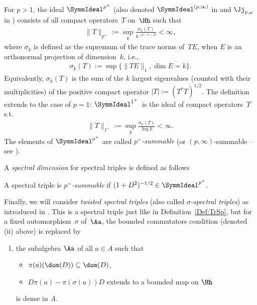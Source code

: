 \begin{Definition}
\label{Def:DixmierSum}
For $p>1$, the ideal $\SymmIdeal^{p^+}$ (also denoted $\SymmIdeal^{(p,\infty )}$ in \cite{NCG} and $\Jj_{p, \omega}$ in \cite[p.~21]{TraceIdealsSimon}) consists of all compact operators~$T$ on~$\Hh$ such that
\begin{gather*}
\| T\|_{p^+} := \sup_k \frac{ \sigma_k(T)}{k^{(p-1)/p}} < \infty,
\end{gather*}
where $\sigma_k$ is def\/ined as the supremum of the trace norms of~$T E$, when $E$ is an orthonormal projection of dimension~$k$, i.e.,
\begin{gather*}
 \sigma_k(T) := \sup \{ \| T E \|_1 , \dim E = k \}.
\end{gather*}
Equivalently, $\sigma_k(T)$ is the sum of the $k$ largest eigenvalues (counted with their multiplicities) of the positive compact operator $|T| := (T^* T)^{1/2}$. The def\/inition extends to the case of $p = 1$: $\SymmIdeal^{1^+}$~is the ideal of compact operators~$T$ s.t.\
\begin{gather*}
\| T \|_{1^+} := \sup_k \frac{ \sigma_k(T)}{\log k} < \infty .
\end{gather*}
The elements of $\SymmIdeal^{p^+}$ are called \emph{$p^+$-summable} (or $(p, \infty )$-summable -- see \cite[Section~IV.2$\alpha$, p.~299 and following]{NCG}).
\end{Definition}

A \emph{spectral dimension} for spectral triples is def\/ined as follows
\begin{Definition}
A spectral triple is \emph{$p^+$-summable} if $(1 + D^2)^{-1/2} \in \SymmIdeal^{p^+}$.
\end{Definition}

Finally, we will consider \emph{twisted spectral triples} (also called \emph{$\sigma$-spectral triples}) as introduced in \cite[Def\/inition~3.1]{TrSpTypeIII}. This is a spectral triple just like in Def\/inition~\ref{Def:TrSp}, but for a f\/ixed automorphism~$\sigma$ of~$\Aa$, the bounded commutators condition (denoted (ii) %
above) is replaced by
\begin{enumerate}\itemsep=0pt
\item[(ii)]
the subalgebra $\Aa$ of all $a\in A$ such that
\begin{itemize}\itemsep=0pt
\item
$\pi(a) (\dom(D)) \subseteq \dom(D)$,
\item
$D\pi(a) - \pi(\sigma(a)) D$ extends to a bounded map on $\Hh$
\end{itemize}
is dense in $A$.
\end{enumerate}

